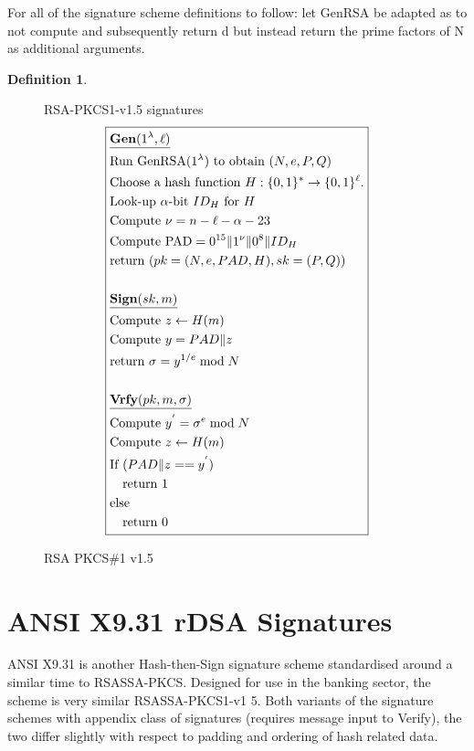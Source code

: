 \documentclass[]{final_report}
\theoremstyle{definition}
\newtheorem{definition}{Definition}[chapter]
\begin{document}
For all of the signature scheme definitions to follow: let GenRSA be adapted as to not compute and subsequently return d but instead return the prime factors of N as additional arguments.
\begin{definition}
\begin{figure}[H]
\centering
\hfill RSA-PKCS1-v1.5 signatures\hfill\phantom{} 
\[
\boxed{
\begin{aligned}
&\underline{\textbf{\text{Gen}} (1^\lambda, \ell)} \\
&\text{Run GenRSA}(1^\lambda) \text{ to obtain } (N, e, P, Q) \\
&\text{Choose a hash function } H : \{0, 1\}^* \rightarrow \{0, 1\}^\ell. \\
&\text{Look-up } \alpha\text{-bit } ID_{H} \text{ for } H \\
&\text{Compute } \nu = n - \ell - \alpha - 23 \\
&\text{Compute PAD} = 0^{15} \| 1^{\nu} \| 0^8 \| ID_{H} \\
&\text{return } (pk = (N, e, PAD, H), sk = (P, Q)) \\
\\
&\underline{\textbf{\text{Sign}} (sk, m)} \\
&\text{Compute } z \leftarrow H(m) \\
&\text{Compute } y = PAD  \| z \\
&\text{return } \sigma = y^{1/e} \bmod N \\
\\
&\underline{\textbf{\text{Vrfy}} (pk, m, \sigma)} \\
&\text{Compute } y^{'} = \sigma^{e} \bmod N \\
&\text{Compute } z \leftarrow H(m) \\
&\text{If } (PAD \| z == y^{'}) \\
&\quad \text{return } 1 \\
&\text{else} \\
&\quad \text{return } 0 
\end{aligned}
}
\]
\caption{RSA PKCS\#1 v1.5}
\label{fig:pkcs}
\end{figure}
\end{definition}


\section{ANSI X9.31 rDSA Signatures}
ANSI X9.31 is another Hash-then-Sign signature scheme standardised around a similar time to RSASSA-PKCS. Designed for use in the banking sector, the scheme is very similar RSASSA-PKCS1-v1 5. Both variants of the signature schemes with appendix class of signatures (requires message input to Verify), the two differ slightly with respect to padding and ordering of hash related data.
\end{document}
